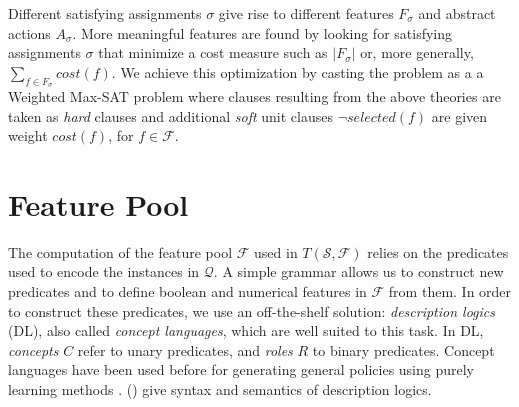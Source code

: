 \documentclass[letterpaper]{article} %
\newcommand{\Omit}[1]{}
\newcommand{\citeay}[1]{\citeauthor{#1} (\citeyear{#1})}
\newtheorem{theorem}[definition]{Theorem}
\newcommand{\Q}{\mathcal{Q}}
\newcommand{\F}{\mathcal{F}}
\renewcommand{\S}{\mathcal{S}}
\begin{document}
\Omit{
The goal expression $G_F$ can be provided explicitly  in terms of the primitive predicates,
but  more generally can be extracted  from the satisfying assignment $\sigma$ as well.
For this, $G_F = G_{\sigma}$ is defined as the DNF formula whose terms 
correspond to the abstract states over the selected features in $F_{\sigma}$ 
that are false in all expanded states in $\S$ marked as non-goals
and true in some expanded goal state. This DNF formula can   be simplified in standard ways. 
Due to  \eqref{eq:d1} and \eqref{eq:goal} that force the selected features in $F_{\sigma}$
to   distinguish goal  from non-goal states, we have that:

\begin{theorem}
For a satisfying assignment $\sigma$  of $T(\S,\F)$, 
$s$ is expanded goal   state in $\S$  iff  $s$ satisfies  $G_F=G_{\sigma}$.
\end{theorem}
}
% 
Different satisfying assignments $\sigma$ give rise to different features $F_{\sigma}$
and abstract actions $A_{\sigma}$. More meaningful features are found by looking for
satisfying assignments $\sigma$ that minimize a cost measure such as $|F_{\sigma}|$
or, more generally, $\sum_{f \in F_{\sigma}} cost(f)$. We achieve this
optimization by casting the problem as a 
a Weighted Max-SAT problem where clauses resulting from the above theories are taken as \emph{hard} clauses
and additional \emph{soft} unit clauses $\neg selected(f)$ are given weight $cost(f)$, for $f \in \mathcal{F}$.


\section{Feature Pool}

The computation of the feature pool $\F$ used in $T(\S,\F)$
relies on the predicates used to encode the instances in $\Q$.
A simple grammar allows  us to  construct new predicates 
and to define boolean and numerical features in $\F$
from them. 
In order to construct these predicates, we use an off-the-shelf solution:
\emph{description logics} (DL),  also called \emph{concept languages}, which are well suited to this task.
In DL, \emph{concepts} $C$  refer to unary predicates, and \emph{roles} $R$  to binary predicates.
Concept languages have been used before for  generating general policies using purely learning methods  \cite{martin-geffner:generalized,fern:bias}.
\citeay{dl-handbook} give syntax and semantics of description logics.
\end{document}
